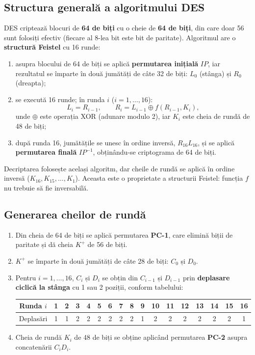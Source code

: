 \documentclass[12pt,a4paper]{article}
\begin{document}
\subsection{Structura generală a algoritmului DES}

DES criptează blocuri de \textbf{64 de biți} cu o cheie de \textbf{64 de biți}, din
care doar 56 sunt folosiți efectiv (fiecare al 8-lea bit este bit de paritate).
Algoritmul are o \textbf{structură Feistel} cu 16 runde:

\begin{enumerate}
    \item asupra blocului de 64 de biți se aplică \textbf{permutarea inițială}
    $IP$, iar rezultatul se împarte în două jumătăți de câte 32 de biți:
    $L_0$ (stânga) și $R_0$ (dreapta);
    \item se execută 16 runde; în runda $i$ ($i = 1, \dots, 16$):
    \[
        L_i = R_{i-1}, \qquad R_i = L_{i-1} \oplus f(R_{i-1}, K_i),
    \]
    unde $\oplus$ este operația XOR (adunare modulo 2), iar $K_i$ este cheia de
    rundă de 48 de biți;
    \item după runda 16, jumătățile se unesc în ordine inversă, $R_{16}L_{16}$, și
    se aplică \textbf{permutarea finală} $IP^{-1}$, obținându-se criptograma de
    64 de biți.
\end{enumerate}

Decriptarea folosește același algoritm, dar cheile de rundă se aplică în ordine
inversă ($K_{16}, K_{15}, \dots, K_1$). Aceasta este o proprietate a structurii
Feistel: funcția $f$ nu trebuie să fie inversabilă.

\subsection{Generarea cheilor de rundă}

\begin{enumerate}
    \item Din cheia de 64 de biți se aplică permutarea \textbf{PC-1}, care elimină
    biții de paritate și dă cheia $K^+$ de 56 de biți.
    \item $K^+$ se împarte în două jumătăți de câte 28 de biți: $C_0$ și $D_0$.
    \item Pentru $i = 1, \dots, 16$, $C_i$ și $D_i$ se obțin din $C_{i-1}$ și
    $D_{i-1}$ prin \textbf{deplasare ciclică la stânga} cu 1 sau 2 poziții, conform
    tabelului:
    \begin{center}
    \small
    \begin{tabular}{|c|*{16}{c|}}
    \hline
    Runda $i$ & 1 & 2 & 3 & 4 & 5 & 6 & 7 & 8 & 9 & 10 & 11 & 12 & 13 & 14 & 15 & 16 \\ \hline
    Deplasări & 1 & 1 & 2 & 2 & 2 & 2 & 2 & 2 & 1 & 2 & 2 & 2 & 2 & 2 & 2 & 1 \\ \hline
    \end{tabular}
    \end{center}
    \item Cheia de rundă $K_i$ de 48 de biți se obține aplicând permutarea
    \textbf{PC-2} asupra concatenării $C_iD_i$.
\end{enumerate}
\end{document}
